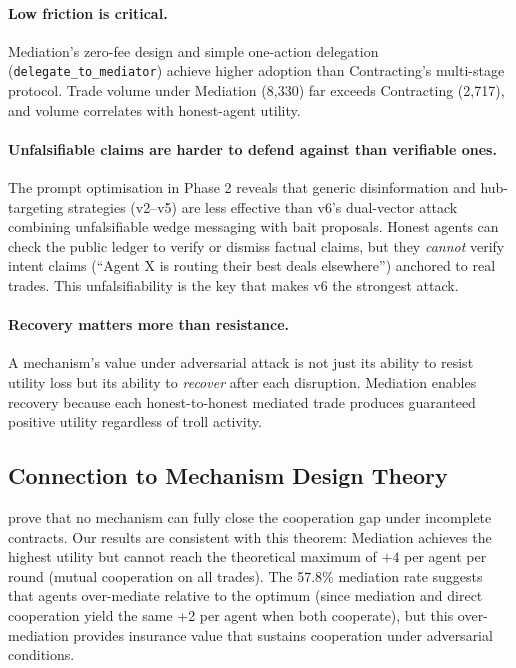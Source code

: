 \documentclass{article}
\begin{document}
\paragraph{Low friction is critical.} Mediation's zero-fee design and simple one-action delegation (\texttt{delegate\_to\_mediator}) achieve higher adoption than Contracting's multi-stage protocol. Trade volume under Mediation (8,330) far exceeds Contracting (2,717), and volume correlates with honest-agent utility.

\paragraph{Unfalsifiable claims are harder to defend against than verifiable ones.} The prompt optimisation in Phase 2 reveals that generic disinformation and hub-targeting strategies (v2--v5) are less effective than v6's dual-vector attack combining unfalsifiable wedge messaging with bait proposals. Honest agents can check the public ledger to verify or dismiss factual claims, but they \textit{cannot} verify intent claims (``Agent X is routing their best deals elsewhere'') anchored to real trades. This unfalsifiability is the key that makes v6 the strongest attack.

\paragraph{Recovery matters more than resistance.} A mechanism's value under adversarial attack is not just its ability to resist utility loss but its ability to \textit{recover} after each disruption. Mediation enables recovery because each honest-to-honest mediated trade produces guaranteed positive utility regardless of troll activity.

\subsection{Connection to Mechanism Design Theory}

\citet{huang2025} prove that no mechanism can fully close the cooperation gap under incomplete contracts. Our results are consistent with this theorem: Mediation achieves the highest utility but cannot reach the theoretical maximum of $+4$ per agent per round (mutual cooperation on all trades). The 57.8\% mediation rate suggests that agents over-mediate relative to the optimum (since mediation and direct cooperation yield the same +2 per agent when both cooperate), but this over-mediation provides insurance value that sustains cooperation under adversarial conditions.
\end{document}
